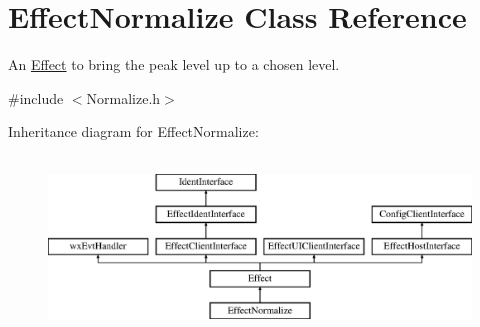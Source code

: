 \hypertarget{class_effect_normalize}{}\section{Effect\+Normalize Class Reference}
\label{class_effect_normalize}


An \hyperlink{class_effect}{Effect} to bring the peak level up to a chosen level.  




{\ttfamily \#include $<$Normalize.\+h$>$}

Inheritance diagram for Effect\+Normalize\+:\begin{figure}[H]
\begin{center}
\leavevmode
\includegraphics[height=4.794520cm]{class_effect_normalize}
\end{center}
\end{figure}
